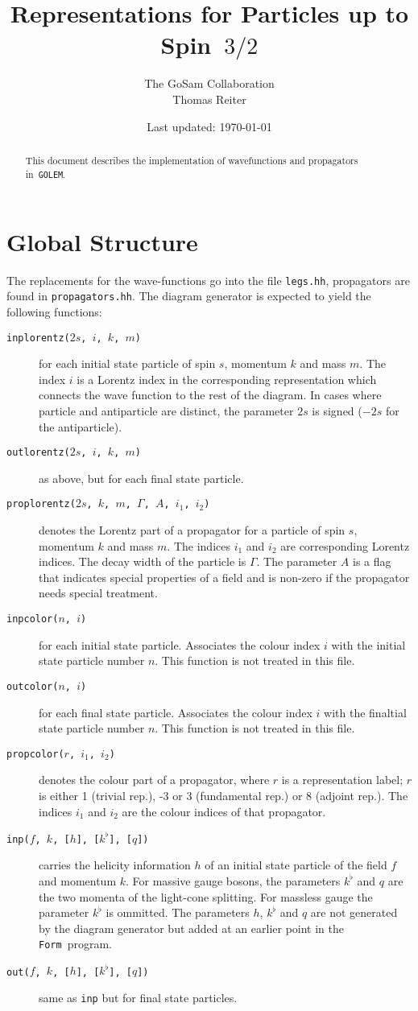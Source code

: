 \documentclass[a4paper,12pt]{amsart}
\date{Last updated: \today}
\author{The GoSam Collaboration\\Thomas Reiter}
\title{Representations for Particles up to Spin~$3/2$}
\newcommand{\form}{{\texttt{Form}}}
\newcommand{\golem}{{\texttt{GOLEM}}}
\begin{document}
\begin{abstract}
This document describes the implementation of wavefunctions and
propagators in~\golem.
\end{abstract}
\maketitle
\tableofcontents
\section{Global Structure}
The replacements for the wave-functions go into the file \texttt{legs.hh},
propagators are found in \texttt{propagators.hh}. The diagram generator is
expected to yield the following functions:
\begin{description}
\item[\texttt{inplorentz($2s$, $i$, $k$, $m$)}] for each initial state
particle of spin $s$, momentum $k$ and mass $m$. The index $i$ is a
Lorentz index in the corresponding representation which connects the
wave function to the rest of the diagram. In cases where particle and
antiparticle are distinct, the parameter $2s$ is signed ($-2s$ for the
antiparticle).
\item[\texttt{outlorentz($2s$, $i$, $k$, $m$)}] as above,
but for each final state particle.
\item[\texttt{proplorentz($2s$, $k$, $m$, $\Gamma$, $A$, $i_1$, $i_2$)}]
denotes the
Lorentz part of a propagator for a particle of spin $s$, momentum $k$ and
mass $m$. The indices $i_1$ and $i_2$ are corresponding Lorentz indices.
The decay width of the particle is $\Gamma$. The parameter $A$ is a flag
that indicates special properties of a field and is non-zero if the
propagator needs special treatment.
\item[\texttt{inpcolor($n$, $i$)}] for each initial state particle.
Associates the colour index $i$ with the initial state particle number $n$.
This function is not treated in this file.
\item[\texttt{outcolor($n$, $i$)}] for each final state particle.
Associates the colour index $i$ with the finaltial state particle number $n$.
This function is not treated in this file.
\item[\texttt{propcolor($r$, $i_1$, $i_2$)}] denotes the colour part of
a propagator, where $r$ is a representation label; $r$ is
either 1 (trivial rep.), -3 or 3 (fundamental rep.) or 8 (adjoint rep.).
The indices $i_1$ and $i_2$ are the colour indices of that propagator.
\item[\texttt{inp($f$, $k$, [$h$], [$k^\flat$], [$q$])}]
carries the helicity information
$h$ of an initial state particle of the field $f$ and momentum $k$.
For massive gauge
bosons, the parameters $k^\flat$ and $q$ are the two momenta of the
light-cone splitting. For massless gauge the parameter $k^\flat$ is
ommitted.
The parameters $h$, $k^\flat$ and $q$ are not generated
by the diagram generator but added at an earlier point
in the \form\ program.
\item[\texttt{out($f$, $k$, [$h$], [$k^\flat$], [$q$])}]
same as \texttt{inp} but for final state particles.
\end{description}
\end{document}

